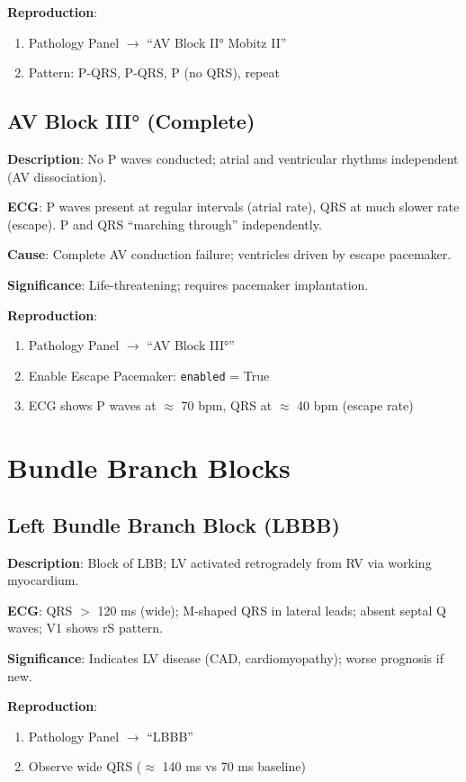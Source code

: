 \documentclass[12pt,oneside,a4paper]{book}
\newcommand{\code}[1]{\texttt{#1}}
\begin{document}
\textbf{Reproduction}:
\begin{enumerate}
  \item Pathology Panel $\to$ ``AV Block II° Mobitz II''
  \item Pattern: P-QRS, P-QRS, P (no QRS), repeat
\end{enumerate}

\subsection{AV Block III° (Complete)}

\textbf{Description}: No P waves conducted; atrial and ventricular rhythms independent (AV dissociation).

\textbf{ECG}: P waves present at regular intervals (atrial rate), QRS at much slower rate (escape). P and QRS ``marching through'' independently.

\textbf{Cause}: Complete AV conduction failure; ventricles driven by escape pacemaker.

\textbf{Significance}: Life-threatening; requires pacemaker implantation.

\textbf{Reproduction}:
\begin{enumerate}
  \item Pathology Panel $\to$ ``AV Block III°''
  \item Enable Escape Pacemaker: \code{enabled} = True
  \item ECG shows P waves at $\approx$ 70 bpm, QRS at $\approx$ 40 bpm (escape rate)
\end{enumerate}

\section{Bundle Branch Blocks}

\subsection{Left Bundle Branch Block (LBBB)}

\textbf{Description}: Block of LBB; LV activated retrogradely from RV via working myocardium.

\textbf{ECG}: QRS $>$ 120 ms (wide); M-shaped QRS in lateral leads; absent septal Q waves; V1 shows rS pattern.

\textbf{Significance}: Indicates LV disease (CAD, cardiomyopathy); worse prognosis if new.

\textbf{Reproduction}:
\begin{enumerate}
  \item Pathology Panel $\to$ ``LBBB''
  \item Observe wide QRS ($\approx$ 140 ms vs 70 ms baseline)
\end{enumerate}
\end{document}
